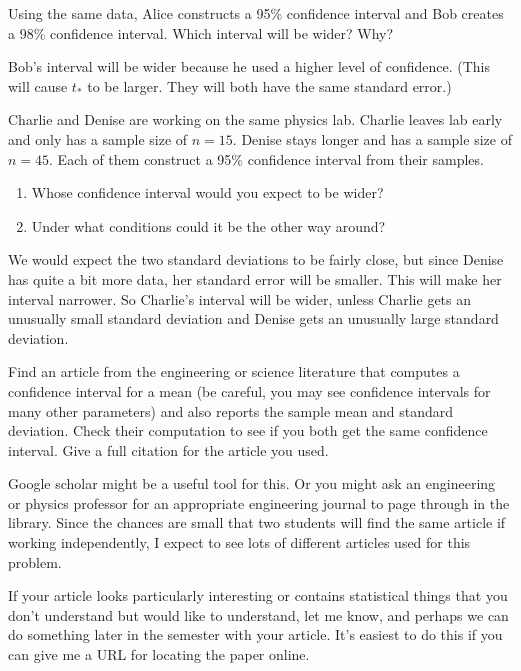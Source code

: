 \documentclass[twoside]{book}\usepackage[]{graphicx}\usepackage[]{xcolor}
\begin{document}
\begin{problem}
	Using the same data, Alice constructs a 95\% confidence interval
	and Bob creates a 98\% confidence interval.  Which interval will be wider?  Why?
\end{problem}

\begin{solution}
	Bob's interval will be wider because he used a higher level of confidence.  (This will
	cause $t_*$ to be larger.  They will both have the same standard error.)
\end{solution}

\begin{problem}
	Charlie and Denise are working on the same physics lab.  Charlie leaves lab early
	and only has a sample size of $n = 15$.  Denise stays longer and has a sample
	size of $n = 45$.  Each of them construct a 95\% confidence interval from their
	samples.
	\begin{enumerate}
		\item
	Whose confidence interval would you expect to be wider?
\item
	Under what conditions could it be the other way around?
	\end{enumerate}
\end{problem}

\begin{solution}
We would expect the two standard deviations to be fairly close, but since Denise 
has quite a bit more data, her standard error will be smaller.  This will make her
interval narrower.  So Charlie's interval will be wider, unless Charlie gets an unusually 
small standard deviation and Denise gets an unusually large standard deviation.
\end{solution}

\begin{problem}
	Find an article from the engineering or science literature that computes a
	confidence interval for a mean (be careful, you may see confidence intervals
	for many other parameters) and also reports the sample mean and
	standard deviation.  Check their computation to see if you both get the
	same confidence interval.  Give a full citation for the article you used.

	Google scholar might be a useful tool for this.  Or you might ask an
	engineering or physics professor for an appropriate engineering journal to
	page through in the library.  Since the chances are small that two students
	will find the same article if working independently, I expect to see lots
	of different articles used for this problem.

	If your article looks particularly interesting or contains statistical 
	things that you don't understand but would like to understand, let me know,
	and perhaps we can do something later in the semester with your article.
	It's easiest to do this if you can give me a URL for locating the paper online.
\end{problem}
\end{document}
